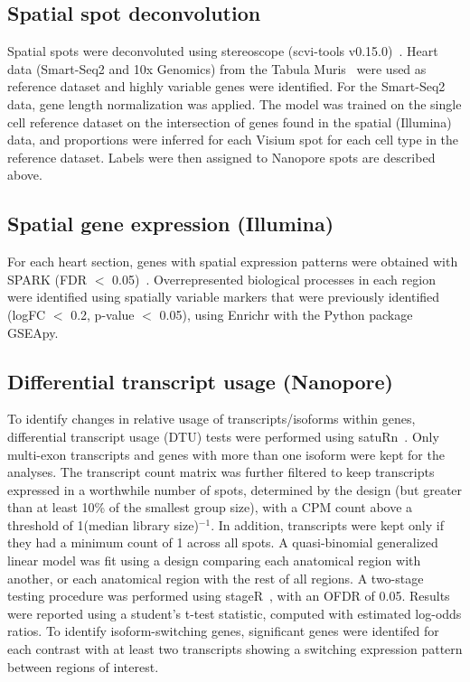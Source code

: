 \documentclass[utf8]{FrontiersinHarvard} %
\begin{document}
\subsection*{Spatial spot deconvolution}
Spatial spots were deconvoluted using stereoscope (scvi-tools v0.15.0)~\citep{Andersson2020:stereoscope}. Heart data (Smart-Seq2 and 10x Genomics) from the Tabula Muris~\citep{Schaum2018:Tabula_muris} were used as reference dataset and highly variable genes were identified. For the Smart-Seq2 data, gene length normalization was applied. The model was trained on the single cell reference dataset on the intersection of genes found in the spatial (Illumina) data, and proportions were inferred for each Visium spot for each cell type in the reference dataset. Labels were then assigned to Nanopore spots are described above.

\subsection*{Spatial gene expression (Illumina)}
For each heart section, genes with spatial expression patterns were obtained with SPARK (FDR $<$ 0.05)~\citep{Sun2020:spark}. 
Overrepresented biological processes in each region were identified using spatially variable markers that were previously identified (logFC $<$ 0.2, p-value $<$ 0.05), using
Enrichr with the Python package GSEApy.

\subsection*{Differential transcript usage (Nanopore)}
To identify changes in relative usage of transcripts/isoforms within genes, differential transcript usage (DTU) tests were performed using satuRn~\citep{Gilis2021:satuRn}. Only multi-exon transcripts and genes with more than one isoform were kept for the analyses. The transcript count matrix was further filtered to keep transcripts expressed in a worthwhile number of spots, determined by the design (but greater than at least 10\% of the smallest group size), with a CPM count above a threshold of 1(median library size)$^{-1}$. In addition, transcripts were kept only if they had a minimum count of 1 across all spots. A quasi-binomial generalized linear model was fit using a design comparing each anatomical region with another, or each anatomical region with the rest of all regions. A two-stage testing procedure was performed using stageR~\citep{R:stageR}, with an OFDR of 0.05. Results were reported using a student's t-test statistic, computed with estimated log-odds ratios.
To identify isoform-switching genes, significant genes were identifed for each contrast with at least two transcripts showing a switching expression pattern between regions of interest.
\end{document}
